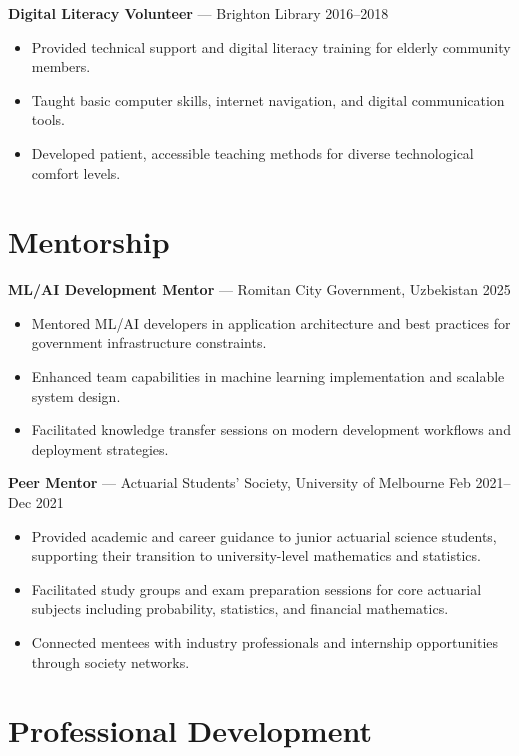 \documentclass[10pt,letterpaper]{article}
\begin{document}
\textbf{Digital Literacy Volunteer} — Brighton Library \hfill 2016--2018\\[-1.1em]
\begin{itemize}
  \item Provided technical support and digital literacy training for elderly community members.
  \item Taught basic computer skills, internet navigation, and digital communication tools.
  \item Developed patient, accessible teaching methods for diverse technological comfort levels.
\end{itemize}

\section*{Mentorship}

\textbf{ML/AI Development Mentor} — Romitan City Government, Uzbekistan \hfill 2025\\[-1.1em]
\begin{itemize}
  \item Mentored ML/AI developers in application architecture and best practices for government infrastructure constraints.
  \item Enhanced team capabilities in machine learning implementation and scalable system design.
  \item Facilitated knowledge transfer sessions on modern development workflows and deployment strategies.
\end{itemize}

\clearpage
\textbf{Peer Mentor} — Actuarial Students' Society, University of Melbourne \hfill Feb 2021--Dec 2021\\[-1.1em]
\begin{itemize}
  \item Provided academic and career guidance to junior actuarial science students, supporting their transition to university-level mathematics and statistics.
  \item Facilitated study groups and exam preparation sessions for core actuarial subjects including probability, statistics, and financial mathematics.
  \item Connected mentees with industry professionals and internship opportunities through society networks.
\end{itemize}

\section*{Professional Development}
\end{document}
